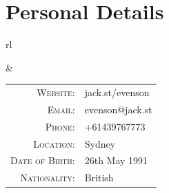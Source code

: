 \section*{Personal Details}

\begin{tabular}{rl}


&

\begin{tabular}{rl}
\textsc{Website:} & jack.st/evenson \\
\textsc{Email:} & evenson@jack.st \\
\textsc{Phone:} & +61439767773 \\
\textsc{Location:} & Sydney \\
\textsc{Date of Birth:} & 26th May 1991 \\
\textsc{Nationality:} & British \\
\end{tabular}

\end{tabular}